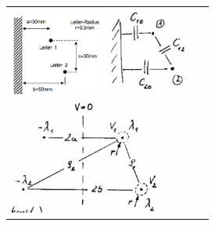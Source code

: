 	\begin{minipage}{6cm}
    	\begin{tabular}{ll}
	    	\includegraphics[width=3cm]{./bilder/LeitungenParallel.png}
			\includegraphics[width=3cm]{./bilder/LeitungenKapazitaeten.png} \\
			\includegraphics[width=5cm]{./bilder/LeitungenParallel2.png}
		\end{tabular}
	\end{minipage}
 
		
